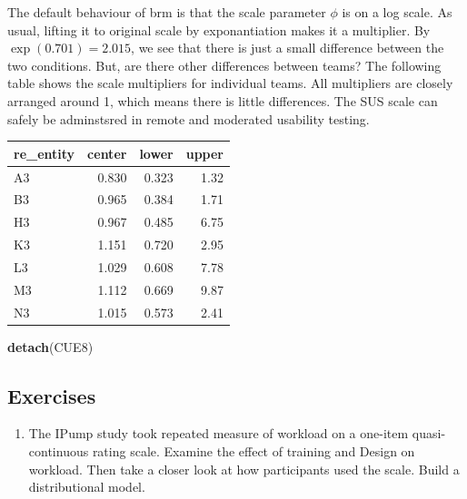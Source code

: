 \documentclass[]{svmono}
\newenvironment{Shaded}{\begin{snugshade}}{\end{snugshade}}
\newcommand{\KeywordTok}[1]{\textcolor[rgb]{0.13,0.29,0.53}{\textbf{#1}}}
\newcommand{\StringTok}[1]{\textcolor[rgb]{0.31,0.60,0.02}{#1}}
\newcommand{\OperatorTok}[1]{\textcolor[rgb]{0.81,0.36,0.00}{\textbf{#1}}}
\newcommand{\NormalTok}[1]{#1}
\providecommand{\tightlist}{%
  \setlength{\itemsep}{0pt}\setlength{\parskip}{0pt}}
\theoremstyle{definition}
\theoremstyle{definition}
\theoremstyle{definition}
\theoremstyle{remark}
\begin{document}
The default behaviour of brm is that the scale parameter \(\phi\) is on
a log scale. As usual, lifting it to original scale by exponantiation
makes it a multiplier. By \(\exp(0.701) = 2.015\), we see that there is
just a small difference between the two conditions. But, are there other
differences between teams? The following table shows the scale
multipliers for individual teams. All multipliers are closely arranged
around 1, which means there is little differences. The SUS scale can
safely be adminstsred in remote and moderated usability testing.

\begin{Shaded}
\end{Shaded}

\begin{tabular}{l|r|r|r}
\hline
re\_entity & center & lower & upper\\
\hline
A3 & 0.830 & 0.323 & 1.32\\
\hline
B3 & 0.965 & 0.384 & 1.71\\
\hline
H3 & 0.967 & 0.485 & 6.75\\
\hline
K3 & 1.151 & 0.720 & 2.95\\
\hline
L3 & 1.029 & 0.608 & 7.78\\
\hline
M3 & 1.112 & 0.669 & 9.87\\
\hline
N3 & 1.015 & 0.573 & 2.41\\
\hline
\end{tabular}

\begin{Shaded}
\begin{Highlighting}[]
\KeywordTok{detach}\NormalTok{(CUE8)}
\end{Highlighting}
\end{Shaded}

\subsection{Exercises}\label{exercises-10}

\begin{enumerate}
\def\labelenumi{\arabic{enumi}.}
\tightlist
\item
  The IPump study took repeated measure of workload on a one-item
  quasi-continuous rating scale. Examine the effect of training and
  Design on workload. Then take a closer look at how participants used
  the scale. Build a distributional model.
\end{enumerate}
\end{document}
